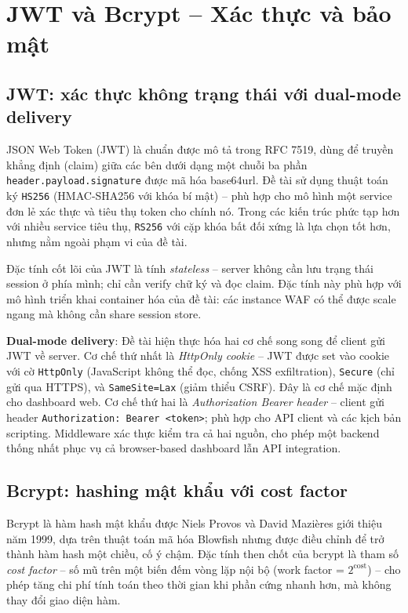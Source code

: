 \documentclass[../DoAn.tex]{subfiles}
\begin{document}
\section{JWT và Bcrypt -- Xác thực và bảo mật}
\label{section:3.6}

\subsection{JWT: xác thực không trạng thái với dual-mode delivery}
\label{subsection:3.6.1}

JSON Web Token (JWT) là chuẩn được mô tả trong RFC 7519, dùng để truyền
khẳng định (claim) giữa các bên dưới dạng một chuỗi ba phần
\texttt{header.payload.signature} được mã hóa base64url. Đề tài sử dụng
thuật toán ký \texttt{HS256} (HMAC-SHA256 với khóa bí mật) -- phù hợp cho
mô hình một service đơn lẻ xác thực và tiêu thụ token cho chính nó. Trong
các kiến trúc phức tạp hơn với nhiều service tiêu thụ, \texttt{RS256} với
cặp khóa bất đối xứng là lựa chọn tốt hơn, nhưng nằm ngoài phạm vi của đề
tài.

Đặc tính cốt lõi của JWT là tính \textit{stateless} -- server không cần
lưu trạng thái session ở phía mình; chỉ cần verify chữ ký và đọc claim.
Đặc tính này phù hợp với mô hình triển khai container hóa của đề tài: các
instance WAF có thể được scale ngang mà không cần share session store.

\textbf{Dual-mode delivery}: Đề tài hiện thực hóa hai cơ chế song song để
client gửi JWT về server. Cơ chế thứ nhất là \textit{HttpOnly cookie} --
JWT được set vào cookie với cờ \texttt{HttpOnly} (JavaScript không thể đọc,
chống XSS exfiltration), \texttt{Secure} (chỉ gửi qua HTTPS), và
\texttt{SameSite=Lax} (giảm thiểu CSRF). Đây là cơ chế mặc định cho dashboard
web. Cơ chế thứ hai là \textit{Authorization Bearer header} -- client gửi
header \texttt{Authorization: Bearer <token>}; phù hợp cho API client và
các kịch bản scripting. Middleware xác thực kiểm tra cả hai nguồn, cho phép
một backend thống nhất phục vụ cả browser-based dashboard lẫn API
integration.

\subsection{Bcrypt: hashing mật khẩu với cost factor}
\label{subsection:3.6.2}

Bcrypt là hàm hash mật khẩu được Niels Provos và David Mazières giới thiệu
năm 1999, dựa trên thuật toán mã hóa Blowfish nhưng được điều chỉnh để
trở thành hàm hash một chiều, cố ý chậm. Đặc tính then chốt của bcrypt là
tham số \textit{cost factor} -- số mũ trên một biến đếm vòng lặp nội bộ
(work factor = \(2^{\text{cost}}\)) -- cho phép tăng chi phí tính toán
theo thời gian khi phần cứng nhanh hơn, mà không thay đổi giao diện hàm.
\end{document}
